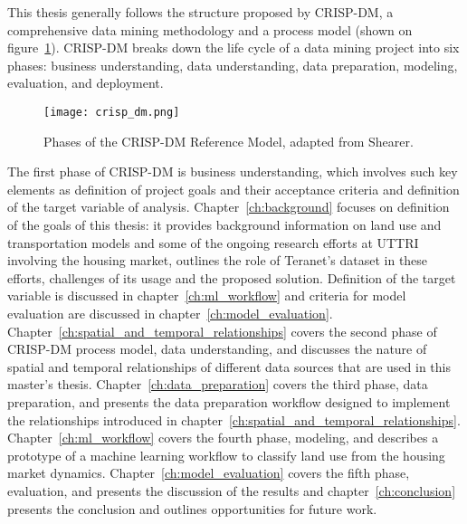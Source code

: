 This thesis generally follows the structure proposed by CRISP-DM, a comprehensive data mining methodology and a process model\cite{Shearer2000} (shown on figure~\ref{fig:crisp_dm}).
CRISP-DM breaks down the life cycle of a data mining project into six phases: business understanding, data understanding, data preparation, modeling, evaluation, and deployment.

\begin{figure}[hbt!]
    \centering
    \texttt{[image: crisp\_dm.png]}
    \caption{Phases of the CRISP-DM Reference Model, adapted from Shearer\cite{Shearer2000}.}
    \label{fig:crisp_dm}
\end{figure}

The first phase of CRISP-DM is business understanding, which involves such key elements as definition of project goals and their acceptance criteria and definition of the target variable of analysis\cite{Nisbet2018}.
Chapter~\ref{ch:background} focuses on definition of the goals of this thesis: it provides background information on land use and transportation models and some of the ongoing research efforts at UTTRI involving the housing market, outlines the role of Teranet's dataset in these efforts, challenges of its usage and the proposed solution.
Definition of the target variable is discussed in chapter~\ref{ch:ml_workflow} and criteria for model evaluation are discussed in chapter~\ref{ch:model_evaluation}.
Chapter~\ref{ch:spatial_and_temporal_relationships} covers the second phase of CRISP-DM process model, data understanding, and discusses the nature of spatial and temporal relationships of different data sources that are used in this master's thesis.
Chapter~\ref{ch:data_preparation} covers the third phase, data preparation, and presents the data preparation workflow designed to implement the relationships introduced in chapter~\ref{ch:spatial_and_temporal_relationships}.
Chapter~\ref{ch:ml_workflow} covers the fourth phase, modeling, and describes a prototype of a machine learning workflow to classify land use from the housing market dynamics.
Chapter~\ref{ch:model_evaluation} covers the fifth phase, evaluation, and presents the discussion of the results and chapter~\ref{ch:conclusion} presents the conclusion and outlines opportunities for future work.